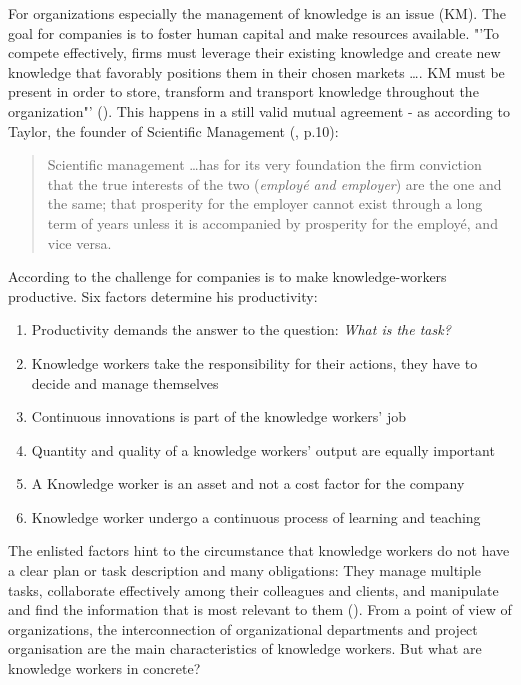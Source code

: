 For organizations especially the management of knowledge is an issue (\ac{KM}).  The goal for companies is to foster human capital and make resources available.  "'To compete effectively, firms must leverage their existing knowledge and create new knowledge that favorably positions them in their chosen markets \dots. \acs{KM} must be present in order to store, transform and transport knowledge throughout the organization"' (\cite{gold2001knowledge}). This happens in a still valid mutual agreement - as according to Taylor, the founder of Scientific Management (\cite{taylor2013scientific}, p.10):
\begin{quotation}
Scientific management \dots has for its very foundation the firm conviction that the true interests of the two (\textit{employé and employer}) are the one and the same; that prosperity for the employer cannot exist through a long term of years unless it is accompanied by prosperity for the employé, and vice versa.
\end{quotation}

According to \cite{drucker1999knowledge} the challenge for companies is to make knowledge-workers productive. Six factors determine his productivity:
\begin{enumerate}
  \item Productivity demands the answer to the question: \textit{What is the task?}
  \item Knowledge workers take the responsibility for their actions, they have to decide and manage themselves
  \item Continuous innovations is part of the knowledge workers' job
  \item Quantity and quality of a knowledge workers' output are equally important
  \item A Knowledge worker is an asset and  not a cost factor for the company
  \item Knowledge worker undergo a continuous process of learning and teaching
\end{enumerate}


The enlisted factors hint to the circumstance that knowledge workers do not have a clear plan or task description and many obligations: They manage multiple tasks, collaborate effectively among their colleagues and clients, and manipulate and find the information that is most relevant to them (\cite{voida2002integrating}). From a point of view of organizations, the interconnection of organizational departments and project organisation are the main characteristics of knowledge workers. But what are knowledge workers in concrete? 

